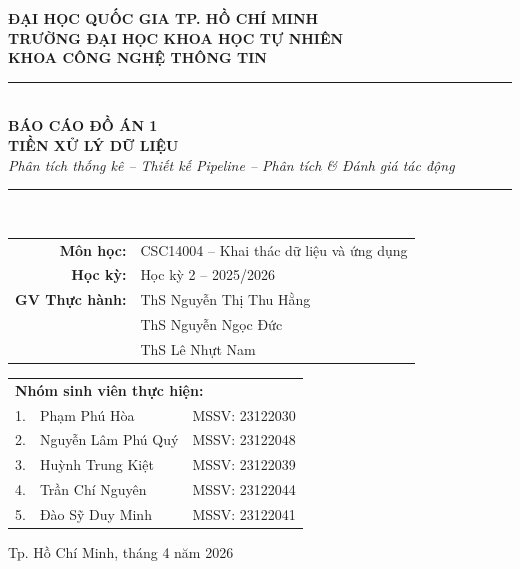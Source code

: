 \documentclass[12pt,a4paper]{article}
\title{}
\author{}
\date{}
\let\oldtextbf\textbf
\renewcommand{\textbf}[1]{\oldtextbf{\textcolor{hcmublue}{#1}}}
\begin{document}
\begin{titlepage}
    \centering
    \vspace*{0.5cm}

    {\Large \textbf{ĐẠI HỌC QUỐC GIA TP. HỒ CHÍ MINH}}\\[0.3cm]
    {\Large \textbf{TRƯỜNG ĐẠI HỌC KHOA HỌC TỰ NHIÊN}}\\[0.3cm]
    {\Large \textbf{KHOA CÔNG NGHỆ THÔNG TIN}}\\[1.2cm]


    \rule{\linewidth}{0.5mm}\\[0.4cm]
    {\huge \textbf{BÁO CÁO ĐỒ ÁN 1}}\\[0.3cm]
    {\LARGE \textbf{TIỀN XỬ LÝ DỮ LIỆU}}\\[0.2cm]
    {\large \textit{Phân tích thống kê -- Thiết kế Pipeline -- Phân tích \& Đánh giá tác động}}\\[0.4cm]
    \rule{\linewidth}{0.5mm}\\[1.2cm]

    \begin{tabular}{rl}
        \textbf{Môn học:}  & CSC14004 -- Khai thác dữ liệu và ứng dụng\\[0.2cm]
        \textbf{Học kỳ:}   & Học kỳ 2 -- 2025/2026\\[0.2cm]
        \textbf{GV Thực hành:} & ThS Nguyễn Thị Thu Hằng\\
                           & ThS Nguyễn Ngọc Đức\\
                           & ThS Lê Nhựt Nam
    \end{tabular}

    \vfill

    \begin{tabular}{r p{6cm} l}
        \multicolumn{3}{l}{\textbf{\large Nhóm sinh viên thực hiện:}}\\[0.5cm]
        1. & Phạm Phú Hòa         & MSSV: 23122030 \\
        2. & Nguyễn Lâm Phú Quý  & MSSV: 23122048 \\
        3. & Huỳnh Trung Kiệt     & MSSV: 23122039 \\
        4. & Trần Chí Nguyên      & MSSV: 23122044 \\
        5. & Đào Sỹ Duy Minh      & MSSV: 23122041 \\
    \end{tabular}

    \vfill
    {\large Tp. Hồ Chí Minh, tháng 4 năm 2026}
\end{titlepage}
\end{document}

